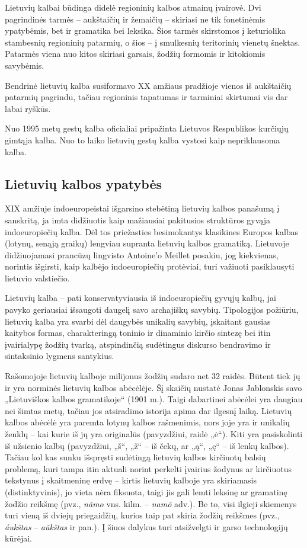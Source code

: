 \begin{multicols}{2}
Lietuvių kalbai būdinga didelė regioninių kalbos atmainų įvairovė. Dvi pagrindinės tarmės – aukštaičių ir žemaičių – skiriasi ne tik fonetinėmis ypatybėmis, bet ir gramatika bei leksika. Šios tarmės skirstomos į keturiolika stambesnių regioninių patarmių, o šios – į smulkesnių teritorinių vienetų šnektas. Patarmės viena nuo kitos skiriasi garsais, žodžių formomis ir kitokiomis savybėmis.

Bendrinė lietuvių kalba susiformavo XX amžiaus pradžioje vienos iš aukštaičių patarmių pagrindu, tačiau regioninis tapatumas ir tarminiai skirtumai vis dar labai ryškūs.

Nuo 1995 metų gestų kalba oficialiai pripažinta Lietuvos Respublikos kurčiųjų gimtąja kalba. Nuo to laiko lietuvių gestų kalba vystosi kaip nepriklausoma kalba.

\subsection{Lietuvių kalbos ypatybės}

 XIX amžiuje indoeuropeistai išgarsino stebėtiną lietuvių kalbos panašumą į sanskritą, ja imta didžiuotis kaip mažiausiai pakitusios struktūros gyvąja indoeuropiečių kalba. Dėl tos priežasties besimokantys klasikines Europos kalbas (lotynų, senąją graikų) lengviau supranta lietuvių kalbos gramatiką. Lietuvoje didžiuojamasi prancūzų lingvisto Antoine’o Meillet posakiu, jog kiekvienas, norintis išgirsti, kaip kalbėjo indoeuropiečių protėviai, turi važiuoti pasiklausyti lietuvio valstiečio.

Lietuvių kalba – pati konservatyviausia iš indoeuropiečių gyvųjų kalbų, jai pavyko geriausiai išsaugoti daugelį savo archajiškų savybių. Tipologijos požiūriu, lietuvių kalba yra svarbi dėl daugybės unikalių savybių, įskaitant gausias kaitybos formas, charakteringą toninio ir dinaminio kirčio sintezę bei itin įvairialypę žodžių tvarką, atspindinčią sudėtingus diskurso bendravimo ir sintaksinio lygmens santykius.

Rašomojoje lietuvių kalboje milijonus žodžių sudaro net 32 raidės. Būtent tiek jų ir yra norminės lietuvių kalbos abėcėlėje. Šį skaičių nustatė Jonas Jablonskis savo „Lietuviškos kalbos gramatikoje“ (1901 m.). Taigi dabartinei abėcėlei yra daugiau nei šimtas metų, tačiau jos atsiradimo istorija apima dar ilgesnį laiką. Lietuvių kalbos abėcėlė yra paremta lotynų kalbos rašmenimis, nors joje yra ir unikalių ženklų – kai kurie iš jų yra originalūs (pavyzdžiui, raidė „ė“). Kiti yra pasiskolinti iš užsienio kalbų (pavyzdžiui, „š“, „ž“ – iš čekų,  ar „ą“, „ę“ – iš lenkų kalbos). Tačiau kol kas sunku išspręsti sudėtingą lietuvių kalbos kirčiuotų balsių problemą, kuri tampa itin aktuali norint perkelti įvairius žodynus ar kirčiuotus tekstynus į skaitmeninę erdvę – kirtis lietuvių kalboje yra skiriamasis (distinktyvinis), jo vieta nėra fiksuota, taigi jis gali lemti leksinę ar gramatinę žodžio reikšmę (pvz., \textit{nãmo} vns. kilm. – \textit{namõ} adv.). Be to, visi ilgieji skiemenys turi vieną iš dviejų priegaidžių, kurios taip pat skiria žodžių reikšmes (pvz., \textit{áukštas} – \textit{aũkštas}  ir pan.).
Į šiuos dalykus turi atsižvelgti ir garso technologijų kūrėjai.
    

\end{multicols}
